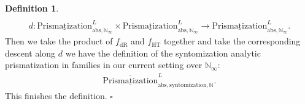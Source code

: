 \documentclass[12pt]{article}
\theoremstyle{definition}
\newtheorem{definition}{Definition}
\begin{document}
\begin{definition}
\begin{align}
\end{align}
\begin{align}
d:  {\underline{\mathrm{Prismatization}}}^L_{\mathrm{abs},\mathbb{N}_\infty}\times {\underline{\mathrm{Prismatization}}}^L_{\mathrm{abs},\mathbb{N}_\infty} \rightarrow {\underline{\mathrm{Prismatization}}}^L_{\mathrm{abs},\mathbb{N}_\infty}.
\end{align}
Then we take the product of $f_\mathrm{dR}$ and $f_\mathrm{HT}$ together and take the corresponding descent along $d$ we have the definition of the syntomization analytic prismatization in families in our current setting over $\mathbb{N}_\infty$:
\begin{align}
\overline{\underline{\mathrm{Prismatization}}}^L_{\mathrm{abs},\mathrm{syntomization},\mathbb{N}}. 
\end{align}
This finishes the definition. $\square$
\end{definition}
\end{document}
